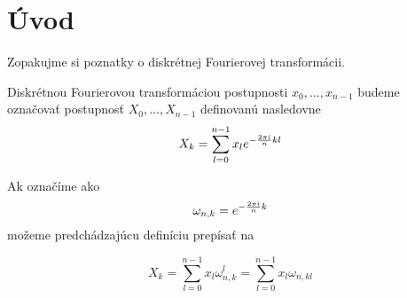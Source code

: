 \section{Úvod}

Zopakujme si poznatky o diskrétnej Fourierovej transformácii.
\begin{definicia}
    Diskrétnou Fourierovou transformáciou postupnosti $x_0, \dots,
    x_{n-1}$ budeme označovať postupnosť $X_0, \dots, X_{n-1}$
    definovanú nasledovne
    \begin{equation}
        X_k = \sum_{l=0}^{n-1} x_l e^{-\frac{2\pi\hat{\imath}}{n}kl}
        \label{eq:dft}
    \end{equation}
\label{def:dft}
\end{definicia}
Ak označíme  ako
\begin{equation}
    \omega_{n,k} = e^ { -\frac{2\pi \hat{\imath}}{n} k}
    \label{eq:omega}
\end{equation}
možeme predchádzajúcu definíciu prepísať na

\begin{equation}
    X_k = \sum_{l=0}^{n-1} x_l \omega_{n,k}^l =
          \sum_{l=0}^{n-1} x_l \omega_{n,kl}
    \label{eq:dft_omega}
\end{equation}
